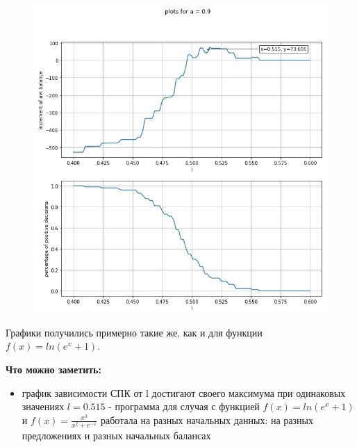 \documentclass{article}
\begin{document}
\begin{figure}[H]
\begin{minipage}[h]{0.48\linewidth}
	\end{minipage}
	\hfill
	\begin{minipage}[h]{0.48\linewidth}
		\includegraphics[width=1.0\linewidth]{assets/plot_a09_v2.jpg}
	\end{minipage}
\end{figure}
Графики получились примерно такие же, как и для функции\\
 $f(x) = ln(e^x + 1)$.\\
 \begin{conclusion}
 \textbf{Что можно заметить:}
 	\begin{itemize}
 	\item график зависимости СПК от l достигают своего максимума при одинаковых значениях $l = 0.515$ - программа для случая с функцией $f(x) = ln(e^x + 1)$ и $f(x) = \frac{x^3}{x^2 + e^{-x}}$ работала на разных начальных данных: на разных предложениях и разных начальных балансах 
 \end{itemize}
\end{conclusion}
\null\newpage
\end{document}
